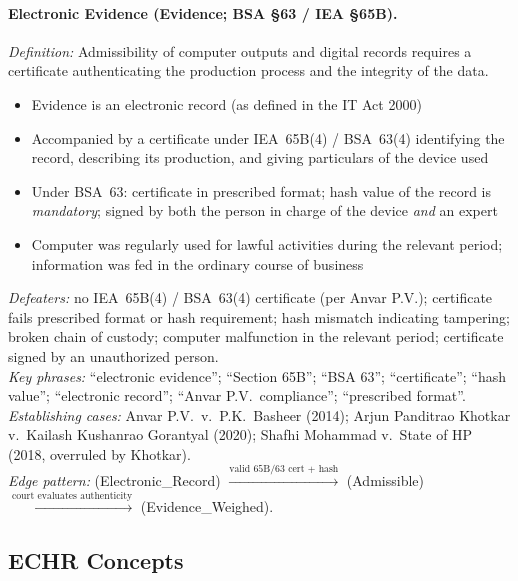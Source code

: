 \documentclass[11pt]{article}
\begin{document}
\paragraph{Electronic Evidence (Evidence; BSA \S63 / IEA \S65B).}
\textit{Definition:} Admissibility of computer outputs and digital records requires a certificate authenticating the production process and the integrity of the data.
\begin{itemize}[nosep,leftmargin=*]
  \item[\textsc{and}] Evidence is an electronic record (as defined in the IT Act 2000)
  \item[\textsc{and}] Accompanied by a certificate under IEA~65B(4) / BSA~63(4) identifying the record, describing its production, and giving particulars of the device used
  \item[\textsc{and}] Under BSA~63: certificate in prescribed format; hash value of the record is \emph{mandatory}; signed by both the person in charge of the device \emph{and} an expert
  \item[\textsc{and}] Computer was regularly used for lawful activities during the relevant period; information was fed in the ordinary course of business
\end{itemize}
\textit{Defeaters:} no IEA~65B(4) / BSA~63(4) certificate (per Anvar P.V.); certificate fails prescribed format or hash requirement; hash mismatch indicating tampering; broken chain of custody; computer malfunction in the relevant period; certificate signed by an unauthorized person.\\
\textit{Key phrases:} ``electronic evidence''; ``Section 65B''; ``BSA 63''; ``certificate''; ``hash value''; ``electronic record''; ``Anvar P.V.\ compliance''; ``prescribed format''.\\
\textit{Establishing cases:} Anvar P.V.\ v.\ P.K.\ Basheer (2014); Arjun Panditrao Khotkar v.\ Kailash Kushanrao Gorantyal (2020); Shafhi Mohammad v.\ State of HP (2018, overruled by Khotkar).\\
\textit{Edge pattern:} (Electronic\_Record) $\xrightarrow{\text{valid 65B/63 cert + hash}}$ (Admissible) $\xrightarrow{\text{court evaluates authenticity}}$ (Evidence\_Weighed).

\subsection{ECHR Concepts}
\label{app:ontology:echr}
\end{document}
